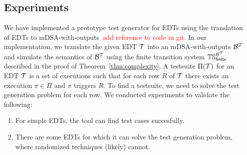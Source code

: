 \subsection{Experiments}
\label{sec:experiments}
We have implemented a prototype test generator for EDTs using the translation of EDTs to mDSA-with-outputs~\textcolor{red}{add reference to code in git}. In our implementation, we translate the given EDT $\mathcal{T}$ into an mDSA-with-outputs $\mathcal{B}^{\mathcal{T}}$ and simulate the semantics of $\mathcal{B}^{\mathcal{T}}$ using the finite transition system $\mathbb{TS}_{\mathsf{finite}}^{\mathcal{B}^{\mathcal{T}}}$ described in the proof of Theorem~\ref{thm:complexity}.
A testsuite $\Pi(\mathcal{T})$ for an EDT $\mathcal{T}$ is a set of executions such
that for each row $R$ of $\mathcal{T}$ there exists an execution
$\pi \in \Pi$ and $\pi$ triggers $R$. To find a testsuite, we need to solve the test generation problem for each row.
We conducted experiments to validate the following:

\begin{enumerate}
\item For simple EDTs, the tool can find test cases succesfully.
\item There are some EDTs for which it can solve the test
  generation problem, where randomized techniques (likely) cannot.
\end{enumerate}


